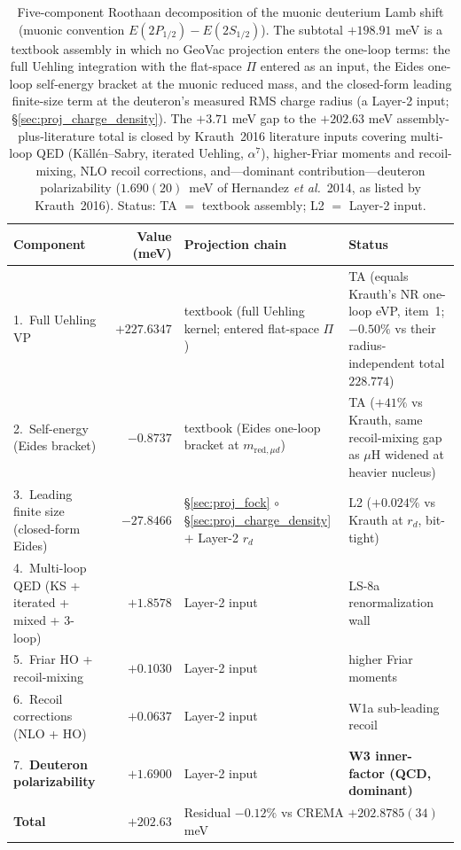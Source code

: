 \documentclass[11pt]{article}
\begin{document}
\begin{table}[h!]
\centering\small
\caption{Five-component Roothaan decomposition of the muonic
deuterium Lamb shift (muonic convention $E(2P_{1/2})-E(2S_{1/2})$).
The subtotal $+198.91$ meV is a textbook assembly in which no GeoVac
projection enters the one-loop terms: the full Uehling integration with
the flat-space $\Pi$ entered as an input, the Eides one-loop
self-energy bracket at the muonic reduced mass, and the closed-form
leading finite-size term at the deuteron's measured RMS charge radius (a Layer-2
input; \S\ref{sec:proj_charge_density}).  The $+3.71$ meV gap
to the $+202.63$ meV assembly-plus-literature total is closed by
Krauth~2016 literature inputs covering multi-loop QED
(K\"all\'en--Sabry, iterated Uehling, $\alpha^7$), higher-Friar
moments and recoil-mixing, NLO recoil corrections, and---dominant
contribution---deuteron polarizability ($1.690(20)$~meV of
Hernandez \emph{et al.}\ 2014, as listed by Krauth~2016).  Status: TA $=$ textbook assembly; L2 $=$
Layer-2 input.}
\label{tab:autopsy_mud_lamb}
\begin{tabular}{p{4.7cm} r p{4.8cm} l}
\toprule
Component & Value (meV) & Projection chain & Status \\
\midrule
1.~Full Uehling VP & $+227.6347$ &
textbook (full Uehling kernel; entered flat-space $\Pi$)
& TA (equals Krauth's NR one-loop eVP, item~1; $-0.50\%$ vs their radius-independent total $228.774$) \\
2.~Self-energy (Eides bracket) & $-0.8737$ &
textbook (Eides one-loop bracket at $m_{\text{red},\mu d}$)
& TA ($+41\%$ vs Krauth, same recoil-mixing gap as $\mu$H widened
at heavier nucleus) \\
3.~Leading finite size (closed-form Eides) & $-27.8466$ &
\S\ref{sec:proj_fock} $\circ$ \S\ref{sec:proj_charge_density}
$+$ Layer-2 $r_d$
& L2 ($+0.024\%$ vs Krauth at $r_d$, bit-tight) \\
4.~Multi-loop QED (KS + iterated + mixed + 3-loop) & $+1.8578$ &
Layer-2 input & LS-8a renormalization wall \\
5.~Friar HO + recoil-mixing & $+0.1030$ &
Layer-2 input & higher Friar moments \\
6.~Recoil corrections (NLO + HO) & $+0.0637$ &
Layer-2 input & W1a sub-leading recoil \\
7.~\textbf{Deuteron polarizability} & $\mathbf{+1.6900}$ &
Layer-2 input & \textbf{W3 inner-factor (QCD, dominant)} \\
\midrule
\textbf{Total} & $+202.63$ & \multicolumn{2}{l}{Residual
$-0.12\%$ vs CREMA $+202.8785(34)$ meV} \\
\bottomrule
\end{tabular}
\end{table}
\end{document}
